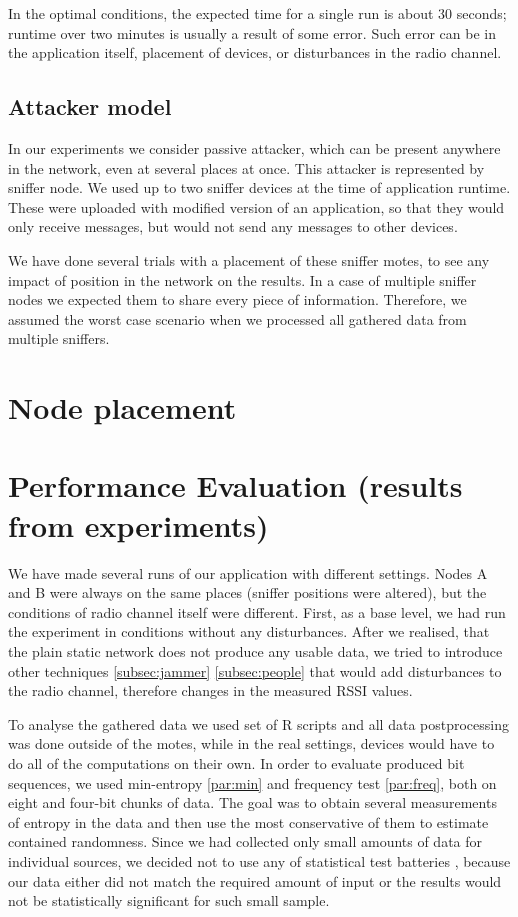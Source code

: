 \documentclass[
  print, %
  Table,   %
  nolof,     %
  nolot,     %
           oneside
]{fithesis3}
\begin{document}
In the optimal conditions, the expected time for a single run is about 30 seconds; runtime over two minutes is usually a result of some error. Such error can be in the application itself, placement of devices, or disturbances in the radio channel.

\subsection{Attacker model}
  In our experiments we consider passive attacker, which can be present anywhere in the network, even at several places at once. This attacker is represented by sniffer node. We used up to two sniffer devices at the time of application runtime. These were uploaded with modified version of an application, so that they would only receive messages, but would not send any messages to other devices.

  We have done several trials with a placement of these sniffer motes, to see any impact of position in the network on the results. In a case of multiple sniffer nodes we expected them to share every piece of information. Therefore, we assumed the worst case scenario when we processed all gathered data from multiple sniffers.



\section{Node placement}


  \section{Performance Evaluation (results from experiments)}\label{sec:results}
  We have made several runs of our application with different settings. Nodes A and B were always on the same places (sniffer positions were altered), but the conditions of radio channel itself were different. First, as a base level, we had run the experiment in conditions without any disturbances. After we realised, that the plain static network does not produce any usable data, we tried to introduce other techniques \ref{subsec:jammer} \ref{subsec:people} that would add disturbances to the radio channel, therefore changes in the measured RSSI values.

  To analyse the gathered data we used set of R scripts %
  and all data postprocessing was done outside of the motes, while in the real settings, devices would have to do all of the computations on their own. In order to evaluate produced bit sequences, we used min-entropy \ref{par:min} and frequency test \ref{par:freq}, both on eight and four-bit chunks of data. The goal was to obtain several measurements of entropy in the data and then use the most conservative of them to estimate contained randomness. Since we had collected only small amounts of data for individual sources, we decided not to use any of statistical test batteries %
  , because our data either did not match the required amount of input or the results would not be statistically significant for such small sample.
\end{document}
